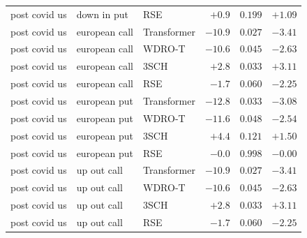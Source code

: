 \documentclass[11pt,oneside]{report}
\begin{document}
\begin{longtable}{lllrrr}
post covid us & down in put & RSE        & $+0.9$  & $0.199$ & $+1.09$ \\
post covid us & european call & Transformer & $-10.9$ & $0.027$ & $-3.41$ \\
post covid us & european call & WDRO-T   & $-10.6$ & $0.045$ & $-2.63$ \\
post covid us & european call & 3SCH     & $+2.8$  & $0.033$ & $+3.11$ \\
post covid us & european call & RSE      & $-1.7$  & $0.060$ & $-2.25$ \\
post covid us & european put & Transformer & $-12.8$ & $0.033$ & $-3.08$ \\
post covid us & european put & WDRO-T    & $-11.6$ & $0.048$ & $-2.54$ \\
post covid us & european put & 3SCH      & $+4.4$  & $0.121$ & $+1.50$ \\
post covid us & european put & RSE       & $-0.0$  & $0.998$ & $-0.00$ \\
post covid us & up out call & Transformer & $-10.9$ & $0.027$ & $-3.41$ \\
post covid us & up out call & WDRO-T     & $-10.6$ & $0.045$ & $-2.63$ \\
post covid us & up out call & 3SCH       & $+2.8$  & $0.033$ & $+3.11$ \\
post covid us & up out call & RSE        & $-1.7$  & $0.060$ & $-2.25$ \\
\end{longtable}








\end{document}
